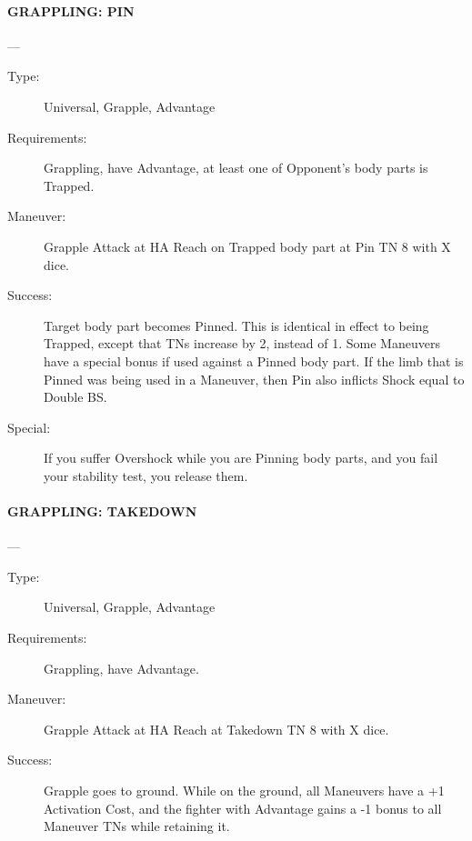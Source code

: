 \documentclass[oneside,11pt,english]{book}
\begin{document}
\paragraph{\large\label{man:GRAPPLING: PIN} GRAPPLING: PIN}---\quad{\large[X]}
\vspace{-10pt}\begin{description} 
\item [Type:] Universal, Grapple, Advantage 
\item [Requirements:] Grappling, have Advantage, at least one of Opponent's body parts is Trapped. 
\item [Maneuver:] Grapple Attack at HA Reach on Trapped body part at Pin TN 8 with X dice. 
\item [Success:] Target body part becomes Pinned. This is identical in effect to being Trapped, except that TNs 
increase by 2, instead of 1. Some Maneuvers have a special bonus if used against a Pinned body part. If 
the limb that is Pinned was being used in a Maneuver, then Pin also inflicts Shock equal to Double BS. 
\item [Special:] If you suffer Overshock while you are Pinning body parts, and you fail your stability test, you 
release them. 
\end{description}
\paragraph{\large\label{man:GRAPPLING: TAKEDOWN} GRAPPLING: TAKEDOWN}---\quad{\large[X]}
\vspace{-10pt}\begin{description} 
\item [Type:] Universal, Grapple, Advantage 
\item [Requirements:] Grappling, have Advantage. 
\item [Maneuver:] Grapple Attack at HA Reach at Takedown TN 8 with X dice. 
\item [Success:] Grapple goes to ground. While on the ground, all Maneuvers have a +1 Activation Cost, and the 
fighter with Advantage gains a -1 bonus to all Maneuver TNs while retaining it. 
\end{description}
\end{document}
